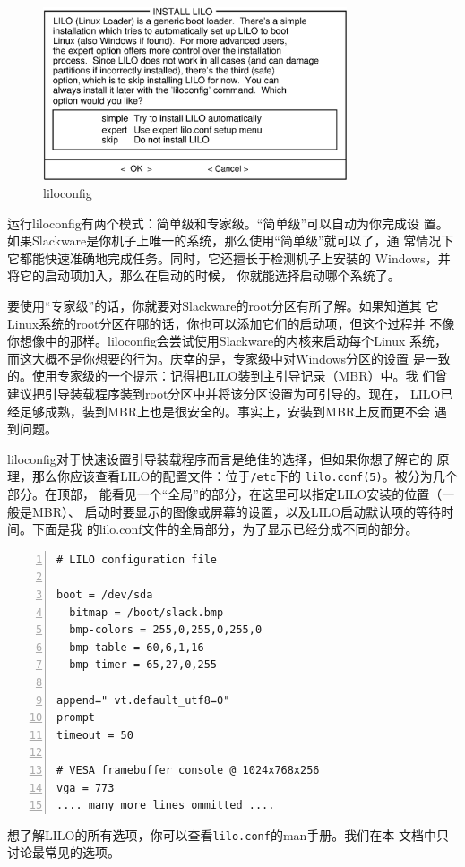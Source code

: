 \begin{figure}[htpb]
  \centering
  \includegraphics[width=0.8\textwidth]{images/installation/setup-lilo.eps}
  \caption{liloconfig}
  \label{fig:booting:setup-lilo}
\end{figure}

运行liloconfig有两个模式：简单级和专家级。``简单级''可以自动为你完成设
置。如果Slackware是你机子上唯一的系统，那么使用``简单级''就可以了，通
常情况下它都能快速准确地完成任务。同时，它还擅长于检测机子上安装的
Windows，并将它的启动项加入，那么在启动的时候，
你就能选择启动哪个系统了。

要使用``专家级''的话，你就要对Slackware的root分区有所了解。如果知道其
它Linux系统的root分区在哪的话，你也可以添加它们的启动项，但这个过程并
不像你想像中的那样。liloconfig会尝试使用Slackware的内核来启动每个Linux
系统，而这大概不是你想要的行为。庆幸的是，专家级中对Windows分区的设置
是一致的。使用专家级的一个提示：记得把LILO装到主引导记录（MBR）中。我
们曾建议把引导装载程序装到root分区中并将该分区设置为可引导的。现在，
LILO已经足够成熟，装到MBR上也是很安全的。事实上，安装到MBR上反而更不会
遇到问题。

liloconfig对于快速设置引导装载程序而言是绝佳的选择，但如果你想了解它的
原理，那么你应该查看LILO的配置文件：位于\texttt{/etc}下的
\texttt{lilo.conf(5)}。被分为几个部分。在顶部，
能看见一个``全局''的部分，在这里可以指定LILO安装的位置（一般是MBR）、
启动时要显示的图像或屏幕的设置，以及LILO启动默认项的等待时间。下面是我
的lilo.conf文件的全局部分，为了显示已经分成不同的部分。

\begin{Verbatim}[frame=single, commandchars=\\\{\}, numbers=left, numberblanklines=fasle]
# LILO configuration file

boot = /dev/sda
  bitmap = /boot/slack.bmp
  bmp-colors = 255,0,255,0,255,0
  bmp-table = 60,6,1,16
  bmp-timer = 65,27,0,255

append=" vt.default_utf8=0"
prompt
timeout = 50

# VESA framebuffer console @ 1024x768x256
vga = 773
.... many more lines ommitted ....
\end{Verbatim}
想了解LILO的所有选项，你可以查看\texttt{lilo.conf}的man手册。我们在本
文档中只讨论最常见的选项。

